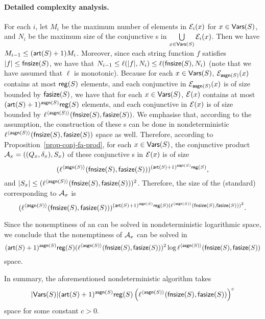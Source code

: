 \paragraph{Detailed complexity analysis.}
For each $i$, 
let $M_i$ be the maximum number of elements in $\mathcal{E}_i(x)$ for $x  \in \mathsf{Vars}(S)$,
and $N_i$ be the maximum size of the conjunctive \FA{}s in $\bigcup \limits_{x \in \mathsf{Vars}(S)} \mathcal{E}_i(x)$.
Then we have $M_{i-1} \le (\mathsf{art}(S)+1)M_i $. Moreover, since each string function $f$ satisfies   $|f| \le \mathsf{fnsize}(S)$, we have that $N_{i-1} \le \ell(|f|, N_i) \le \ell(\mathsf{fnsize}(S), N_i)$ (note that we have assumed that $\ell$ is monotonic). Because for each $x \in \mathsf{Vars}(S)$, $\mathcal{E}_{\mathsf{asgn}(S)}(x)$ contains at most $\mathsf{reg}(S)$ elements, and 
each conjunctive \FA{} in $\mathcal{E}_{\mathsf{asgn}(S)}(x)$ is of size bounded by $\mathsf{fasize}(S)$, we have that for each $x \in \mathsf{Vars}(S)$, $\mathcal{E}(x)$ contains at most $(\mathsf{art}(S)+1)^{\mathsf{asgn}(S)}\mathsf{reg}(S)$ elements, and each conjunctive \FA{} in $\mathcal{E}(x)$ is of size bounded by $\ell^{\langle \mathsf{asgn}(S) \rangle}(\mathsf{fnsize}(S), \mathsf{fasize}(S))$. 
We emphasise that, according to the \prerec{} assumption, the construction of these \FA{}s can be done in nondeterministic $\ell^{\langle \mathsf{asgn}(S) \rangle}(\mathsf{fnsize}(S), \mathsf{fasize}(S))$ space as well. 
Therefore, according to Proposition~\ref{prop-conj-fa-prod}, for each $x \in \mathsf{Vars}(S)$, the conjunctive product \FA{} $\mathcal{A}_x=((Q_x, \delta_x), S_x)$ of these conjunctive \FA{}s  in $\mathcal{E}(x)$ is of size 
$$(\ell^{\langle \mathsf{asgn}(S) \rangle}(\mathsf{fnsize}(S), \mathsf{fasize}(S)))^{(\mathsf{art}(S)+1)^{\mathsf{asgn}(S)} \mathsf{reg}(S)},$$
and $|S_x| \le (\ell^{\langle \mathsf{asgn}(S) \rangle}(\mathsf{fnsize}(S), \mathsf{fasize}(S)))^2$. Therefore, the size of the (standard) \FA{} corresponding to $\mathcal{A}_x$ is 
$$(\ell^{\langle \mathsf{asgn}(S) \rangle}(\mathsf{fnsize}(S), \mathsf{fasize}(S)))^{(\mathsf{art}(S)+1)^{\mathsf{asgn}(S)} \mathsf{reg}(S) (\ell^{\langle \mathsf{asgn}(S) \rangle}(\mathsf{fnsize}(S), \mathsf{fasize}(S)))^2}.$$

Since the nonemptiness of an \FA{} can be solved in nondeterministic logarithmic space, we conclude that the nonemptiness of $\mathcal{A}_x$ can be solved in 
{\small
$$(\mathsf{art}(S)+1)^{\mathsf{asgn}(S)} \mathsf{reg}(S) (\ell^{\langle \mathsf{asgn}(S) \rangle}(\mathsf{fnsize}(S), \mathsf{fasize}(S)))^2 \log \ell^{\langle \mathsf{asgn}(S) \rangle}(\mathsf{fnsize}(S), \mathsf{fasize}(S))$$
}
space.

In summary, the aforementioned nondeterministic algorithm takes 
$$|\mathsf{Vars}(S)|(\mathsf{art}(S)+1)^{\mathsf{asgn}(S)}  \mathsf{reg}(S) \left(\ell^{\langle \mathsf{asgn}(S) \rangle}(\mathsf{fnsize}(S), \mathsf{fasize}(S)) \right)^c$$
 space for some constant $c > 0$.
